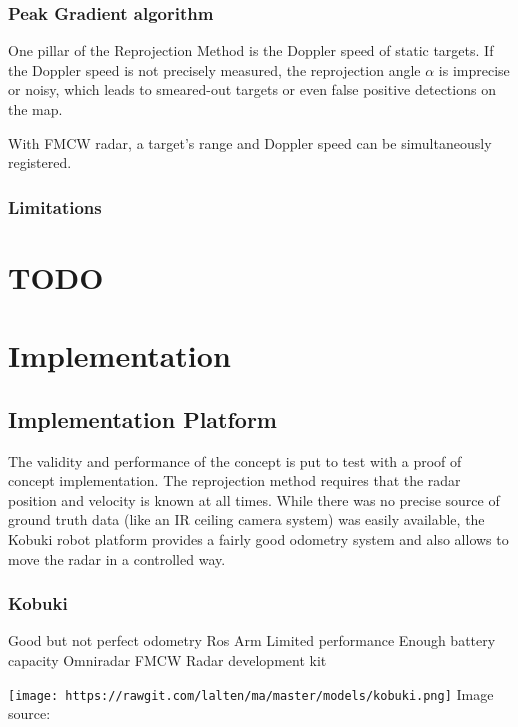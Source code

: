 \subsubsection{Peak Gradient algorithm}\label{peak-gradient-algorithm}

One pillar of the Reprojection Method is the Doppler speed of static
targets. If the Doppler speed is not precisely measured, the
reprojection angle \(\alpha\) is imprecise or noisy, which leads to
smeared-out targets or even false positive detections on the map.

With FMCW radar, a target's range and Doppler speed can be
simultaneously registered.

\subsubsection{Limitations}\label{limitations}

\section{TODO}\label{todo-2}

\section{Implementation}\label{implementation}

\subsection{Implementation Platform}\label{implementation-platform}

The validity and performance of the concept is put to test with a proof
of concept implementation. The reprojection method requires that the
radar position and velocity is known at all times. While there was no
precise source of ground truth data (like an IR ceiling camera system)
was easily available, the Kobuki robot platform provides a fairly good
odometry system and also allows to move the radar in a controlled way.

\subsubsection{Kobuki}\label{kobuki}

Good but not perfect odometry Ros Arm Limited performance Enough battery
capacity Omniradar FMCW Radar development kit

\texttt{[image: https://rawgit.com/lalten/ma/master/models/kobuki.png]}
Image source: \cite{DesignK2013}

